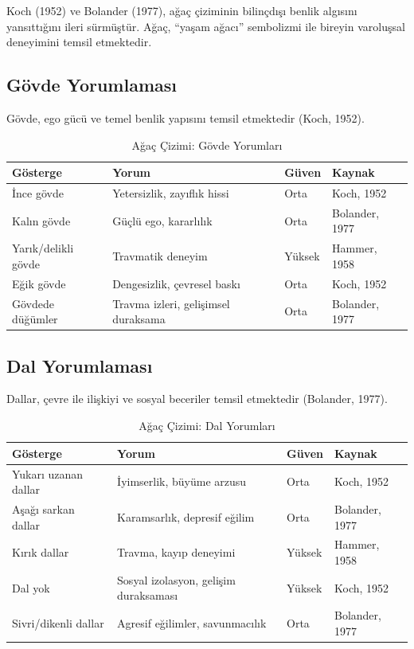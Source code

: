 Koch (1952) ve Bolander (1977), ağaç çiziminin bilinçdışı benlik algısını yansıttığını ileri sürmüştür. Ağaç, ``yaşam ağacı'' sembolizmi ile bireyin varoluşsal deneyimini temsil etmektedir.

\subsection{Gövde Yorumlaması}

Gövde, ego gücü ve temel benlik yapısını temsil etmektedir (Koch, 1952).

\begin{table}[H]
\centering
\caption{Ağaç Çizimi: Gövde Yorumları}
\label{tab:agacgovde}
\begin{tabular}{p{3.5cm}p{5.5cm}p{2cm}p{2cm}}
\toprule
\textbf{Gösterge} & \textbf{Yorum} & \textbf{Güven} & \textbf{Kaynak} \\
\midrule
İnce gövde & Yetersizlik, zayıflık hissi & Orta & Koch, 1952 \\
Kalın gövde & Güçlü ego, kararlılık & Orta & Bolander, 1977 \\
Yarık/delikli gövde & Travmatik deneyim & Yüksek & Hammer, 1958 \\
Eğik gövde & Dengesizlik, çevresel baskı & Orta & Koch, 1952 \\
Gövdede düğümler & Travma izleri, gelişimsel duraksama & Orta & Bolander, 1977 \\
\bottomrule
\end{tabular}
\end{table}

\subsection{Dal Yorumlaması}

Dallar, çevre ile ilişkiyi ve sosyal beceriler temsil etmektedir (Bolander, 1977).

\begin{table}[H]
\centering
\caption{Ağaç Çizimi: Dal Yorumları}
\label{tab:agacdal}
\begin{tabular}{p{3.5cm}p{5.5cm}p{2cm}p{2cm}}
\toprule
\textbf{Gösterge} & \textbf{Yorum} & \textbf{Güven} & \textbf{Kaynak} \\
\midrule
Yukarı uzanan dallar & İyimserlik, büyüme arzusu & Orta & Koch, 1952 \\
Aşağı sarkan dallar & Karamsarlık, depresif eğilim & Orta & Bolander, 1977 \\
Kırık dallar & Travma, kayıp deneyimi & Yüksek & Hammer, 1958 \\
Dal yok & Sosyal izolasyon, gelişim duraksaması & Yüksek & Koch, 1952 \\
Sivri/dikenli dallar & Agresif eğilimler, savunmacılık & Orta & Bolander, 1977 \\
\bottomrule
\end{tabular}
\end{table}


